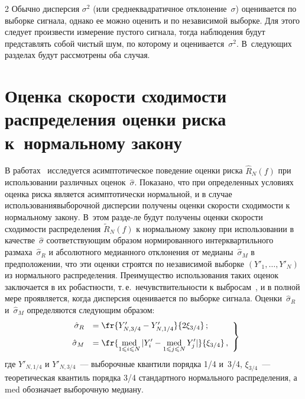 \begin{multicols}{2}
Обычно дисперсия $\sigma^2$ (или среднеквадратичное отклонение~$\sigma$) оценивается по 
выборке сигнала, однако ее можно оценить и по независимой выборке. Для этого следует 
произвести измерение пустого сигнала, тогда наблюдения будут представлять собой чистый 
шум, по которому и оценивается~$\sigma^2$. В~следующих разделах будут рассмотрены оба случая.

\section{Оценка скорости сходимости распределения оценки риска к~нормальному закону}

В работах~\cite{6sh, 7sh, 8sh} исследуется асимптотическое поведение оценки 
риска $\widehat{R}_N(f)$ при использовании различных оценок~$\hat{\sigma}$. 
Показано, что при определенных условиях оценка риска является асимптотически 
нормальной, и в случае использования\linebreak выборочной дисперсии получены оценки 
ско\-рости сходимости к нормальному закону. В~этом разде-\linebreak ле
 будут получены оценки 
ско\-рости схо\-ди\-мости распределения $\widetilde{R}_N(f)$ к нормальному закону при\linebreak 
использовании в качестве~$\hat{\sigma}$ соответствующим образом нормированного 
интерквартильного размаха~$\hat{\sigma}_{R}$ и абсолютного медианного отклонения 
от медианы~$\hat{\sigma}_{M}$ в предположении, что эти оценки строятся по независимой 
выборке $(Y'_1,\ldots,Y'_N)$ из нормального распределения. Преимущество использования 
таких оценок заключается в их робастности, т.\,е.\ нечувствительности к выбросам~\cite{12sh, 13sh}, 
и в полной мере проявляется, когда дисперсия оценивается по выборке сигнала. 
Оценки~$\hat{\sigma}_{R}$ и~$\hat{\sigma}_{M}$ определяются следующим образом:
\begin{equation}
\left.
\begin{array}{rl}
\hat{\sigma}_{R}&=\fr{Y'_{N,3/4}-Y'_{N,1/4}}{2\xi_{3/4}}\,;\\[9pt]
\hat{\sigma}_{M}&=\displaystyle\fr{\mathop{\mbox{med}}\limits_{1\leqslant i\leqslant N}|Y'_i-
\mathop{\mbox{med}}\limits_{1\leqslant j\leqslant N} Y'_j|}{\xi_{3/4}}\,,
\end{array}
\right\}
\label{e6sh}
\end{equation}
где $Y'_{N,1/4}$ и $Y'_{N,3/4}$~--- выборочные квантили порядка 1/4 и~3/4, 
$\xi_{3/4}$~--- теоретическая квантиль порядка 3/4 стандартного нормального распределения, 
а med обозначает выборочную медиану.


\end{multicols}
